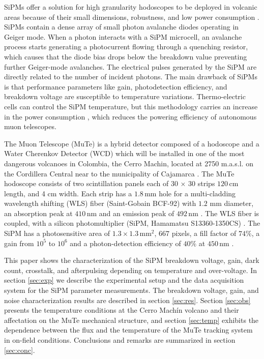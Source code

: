 \documentclass[a4paper,11pt]{article}
\begin{document}
SiPMs offer a solution for high granularity hodoscopes to be deployed in volcanic areas because of their small dimensions, robustness, and low power consumption \cite{Ambrosino2014}. SiPMs contain a dense array of small photon avalanche diodes operating in Geiger mode. When a photon interacts with a SiPM microcell, an avalanche process starts generating a photocurrent flowing through a quenching resistor, which causes that the diode bias drops below the breakdown value preventing further Geiger-mode avalanches. The electrical pulses generated by the SiPM are directly related to the number of incident photons. The main drawback of SiPMs is that performance parameters like gain, photodetection efficiency, and breakdown voltage are susceptible to temperature variations. Thermo-electric cells can control the SiPM temperature, but this methodology carries an increase in the power consumption \cite{Ambrosino2014}, which reduces the powering efficiency of autonomous muon telescopes. 

The Muon Telescope (MuTe) is a hybrid detector composed of a hodoscope and a Water Cherenkov Detector (WCD) which will be installed in one of the most dangerous volcanoes in Colombia, the Cerro Machin, located at 2750 m.a.s.l. on the Cordillera Central near to the municipality of Cajamarca \cite{AsoreyEtal2017B}. The MuTe hodoscope consists of two scintillation panels each of 30 $\times$ 30 strips $120$\,cm length, and 4 cm width. Each strip has a $1.8$\,mm hole for a multi-cladding wavelength shifting (WLS) fiber (Saint-Gobain BCF-92)  with $1.2$ mm diameter, an absorption peak at $410$\,nm and an emission peak of $492$\,nm \cite{SaintGobain2018}. The WLS fiber is coupled, with a silicon photomultiplier (SiPM, Hamamatsu S13360-1350CS) \cite{Hamamatsu2018}. The SiPM has a photosensitive area of $1.3 \times 1.3$\,mm$^2$, $667$ pixels, a fill factor of $74\%$, a gain from $10^5$ to $10^6$ and a photon-detection efficiency of $40 \%$ at $450$\,nm \cite{pena2019calibration, PenaRodriguezEtal2018, VsquezRamrez2020}.


This paper shows the characterization of the SiPM breakdown voltage, gain, dark count, crosstalk, and afterpulsing depending on temperature and over-voltage. In section \ref{sec:exp} we describe the experimental setup and the data acquisition system for the SiPM parameter measurements. The breakdown voltage, gain, and noise characterization results are described in section \ref{sec:res}. Section \ref{sec:obs} presents the temperature conditions at the Cerro Mach\'in volcano and their affectation on the MuTe mechanical structure, and section \ref{sec:temp} exhibits the dependence between the flux and the temperature of the MuTe tracking system in on-field conditions. Conclusions and remarks are summarized in section \ref{sec:conc}.
\end{document}
